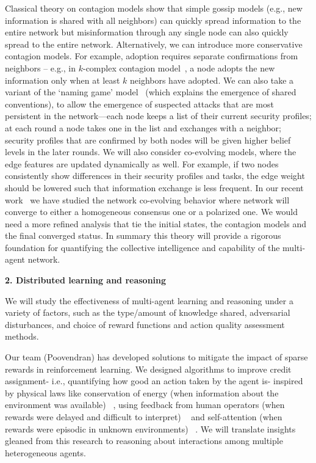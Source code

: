 \documentclass{NSF}
\begin{document}
Classical theory on contagion models show that simple gossip models (e.g., new information is shared with all neighbors) can quickly spread information to the entire network but misinformation through any single node can also quickly spread to the entire network.
Alternatively, we can introduce more conservative contagion models.
For example, adoption requires separate confirmations from neighbors -- e.g., in $k$-complex contagion model~\cite{Ghasemiesfeh:2013:CCW,ebrahimi17complex,gao16general}, a node adopts the new information only when at least $k$ neighbors have adopted.
We can also take a variant of the `naming game' model~\cite{gao2017engineering} (which explains the emergence of shared conventions), to allow the emergence of suspected attacks that are most persistent in the network---each node keeps a list of their current security profiles; at each round a node takes one in the list and exchanges with a neighbor; security profiles that are confirmed by both nodes will be given higher belief levels in the later rounds.
We will also consider co-evolving models, where the edge features are updated dynamically as well.
For example, if two nodes consistently show differences in their security profiles and tasks, the edge weight should be lowered such that information exchange is less frequent.
In our recent work~\cite{wang22coevolution} we have studied the network co-evolving behavior where network will converge to either a homogeneous consensus one or a polarized one.
We would need a more refined analysis that tie the initial states, the contagion models and the final converged status.
In summary this theory will provide a rigorous foundation for quantifying the collective intelligence and capability of the multi-agent network.


\noindent \textbf{2. Distributed learning and reasoning}

We will study the effectiveness of multi-agent learning and reasoning under a variety of factors, such as the type/amount of knowledge shared, adversarial disturbances, and choice of reward functions and action quality assessment methods.

Our team (Poovendran) has developed solutions to mitigate the impact of sparse rewards in reinforcement learning. We designed algorithms to improve credit assignment- i.e., quantifying how good an action taken by the agent is- inspired by physical laws like conservation of energy (when information about the environment was available) ~\cite{xiao2022shaping, xiao2019potential}, using feedback from human operators (when rewards were delayed and difficult to interpret) ~\cite{xiao2020fresh} and self-attention (when rewards were episodic in unknown environments) ~\cite{xiao2022agent}.  We will translate insights gleaned from this research to reasoning about interactions among multiple heterogeneous agents.
\end{document}
